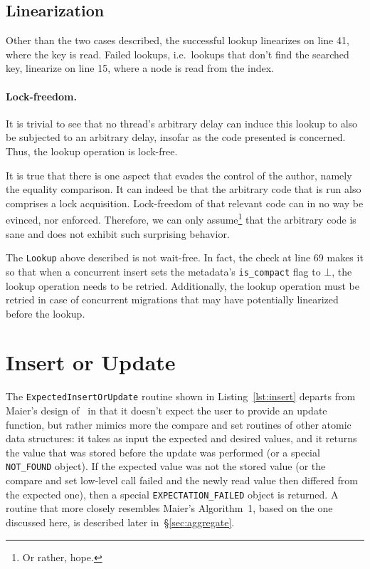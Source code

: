 

\subsection{Linearization}\label{subsec:lookup-linearization}

Other than the two cases described, the successful lookup linearizes on line 41, where the key is read.
Failed lookups, i.e.\ lookups that don't find the searched key, linearize on line 15, where a node is read from the index.


\paragraph{Lock-freedom.}

It is trivial to see that no thread's arbitrary delay can induce this lookup to also be subjected to an arbitrary delay, insofar as the code presented is concerned.
Thus, the lookup operation is lock-free.

It is true that there is one aspect that evades the control of the author, namely the equality comparison.
It can indeed be that the arbitrary code that is run also comprises a lock acquisition.
Lock-freedom of that relevant code can in no way be evinced, nor enforced.
Therefore, we can only assume\footnote{%
	Or rather, hope.
} that the arbitrary code is sane and does not exhibit such surprising behavior.

The \texttt{Lookup} above described is not wait-free.
In fact, the check at line 69 makes it so that when a concurrent insert sets the metadata's \texttt{{is\_compact}} flag to $\bot$, the lookup operation needs to be retried.
Additionally, the lookup operation must be retried in case of concurrent migrations that may have potentially linearized before the lookup.


\section{Insert or Update}\label{sec:insert-or-update}

The \texttt{ExpectedInsertOrUpdate} routine shown in Listing~\ref{lst:insert} departs from Maier's design of~\cite[Algorithm~1]{maier} in that it doesn't expect the user to provide an update function, but rather mimics more the compare and set routines of other atomic data structures: it takes as input the expected and desired values, and it returns the value that was stored before the update was performed (or a special \texttt{{NOT\_FOUND}} object).
If the expected value was not the stored value (or the compare and set low-level call failed and the newly read value then differed from the expected one), then a special \texttt{{EXPECTATION\_FAILED}} object is returned.
A routine that more closely resembles Maier's Algorithm~1, based on the one discussed here, is described later in~\S\ref{sec:aggregate}.

